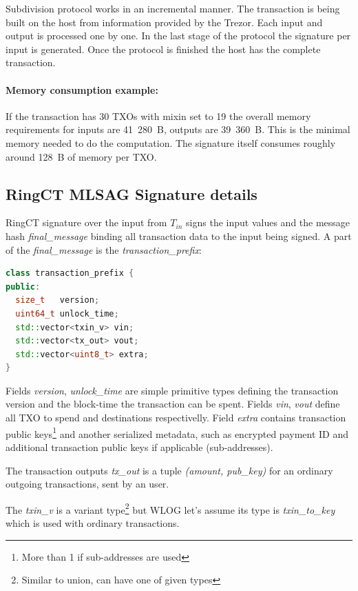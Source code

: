 \documentclass[]{article}
\begin{document}
Subdivision protocol works in an incremental manner. The transaction is being built on the host from information provided by the Trezor. Each input and output is processed one by one. In the last stage of the protocol the signature per input is generated. Once the protocol is finished the host has the complete transaction.

\paragraph{Memory consumption example:}
If the transaction has 30 TXOs with mixin set to 19 the overall memory requirements for inputs are 41~280~B, outputs are 39~360~B. This is the minimal memory needed to do the computation. The signature itself consumes roughly around 128~B of memory per TXO.

\subsection{RingCT MLSAG Signature details}

RingCT signature over the input from $T_{in}$ signs the input values and the message hash \emph{final\_message} binding all transaction data to the input being signed. A part of the \emph{final\_message} is the \emph{transaction\_prefix}:

\begin{lstlisting}[language=c++]
class transaction_prefix {
public:
  size_t   version;
  uint64_t unlock_time;  
  std::vector<txin_v> vin;
  std::vector<tx_out> vout;
  std::vector<uint8_t> extra;
}
\end{lstlisting}

Fields \emph{version}, \emph{unlock\_time} are simple primitive types defining the transaction version and the block-time the transaction can be spent. Fields \emph{vin}, \emph{vout} define all TXO to spend and destinations respectivelly. Field \emph{extra} contains transaction public keys\footnote{More than 1 if sub-addresses are used} and another serialized metadata, such as encrypted payment ID and additional transaction public keys if applicable (sub-addresses).

The transaction outputs \emph{tx\_out} is a tuple \emph{(amount, pub\_key)} for an ordinary outgoing transactions, sent by an user. 

The \emph{txin\_v} is a variant type\footnote{Similar to union, can have one of given types} but WLOG let's assume its type is \emph{txin\_to\_key} which is used with ordinary transactions. 
\end{document}
